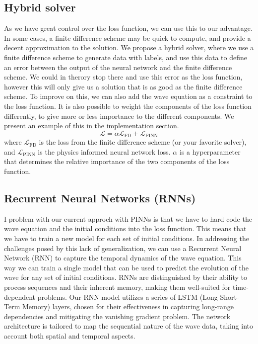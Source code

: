 \documentclass[twoside,11pt]{report}
\begin{document}
\subsection{Hybrid solver}
\label{sec:hybrid}
     
    As we have great control over the loss function, we can use this to our advantage. In some cases, a finite difference
    scheme may be quick to compute, and provide a decent approximation to the solution. We propose a hybrid solver, where
    we use a finite difference scheme to generate data with labels, and use this data to define an error between the
    output of the neural network and the finite difference scheme. We could in therory stop there and use this error
    as the loss function, however this will only give us a solution that is as good as the finite difference scheme.
    To improve on this, we can also add the wave equation as a constraint to the loss function.
    It is also possible to weight the components of the loss function differently, to give more or less 
    importance to the different components. We present an example of this in the implementation section.
    \begin{equation}
    \mathcal{L} = \alpha\mathcal{L}_{\text{FD}} + \mathcal{L}_{\text{PINN}}
    \end{equation}
    where $\mathcal{L}_{\text{FD}}$ is the loss from the finite difference scheme (or your favorite solver), 
    and $\mathcal{L}_{\text{PINN}}$ is the physics informed neural network loss. $\alpha$ is a hyperparameter
    that determines the relative importance of the two components of the loss function.
    \cite{krishnapriyan2021characterizing}

\subsection{Recurrent Neural Networks (RNNs)}
\label{sec:rnn}

    I problem with our current approch with PINNs is that we have to hard code the wave equation and the initial
    conditions into the loss function. This means that we have to train a new model for each set of initial conditions.
    In addressing the challenges posed by this lack of generalization, we can use a Recurrent Neural Network (RNN)
    to capture the temporal dynamics of the wave equation. This way we can train a single model that can be used
    to predict the evolution of the wave for any set of initial conditions. RNNs are distinguished by their ability to 
    process sequences and their inherent memory, making them well-suited for time-dependent problems.
    Our RNN model utilizes a series of LSTM (Long Short-Term Memory) layers, chosen for their 
    effectiveness in capturing long-range dependencies and mitigating the vanishing gradient problem.
    The network architecture is tailored to map the sequential nature of the wave data, taking 
    into account both spatial and temporal aspects.
\end{document}
